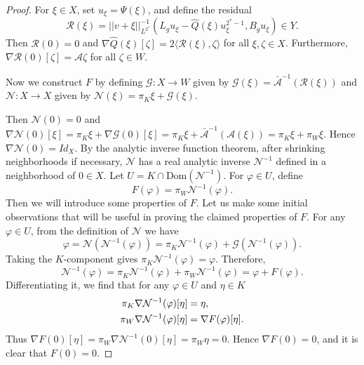 \documentclass[12pt]{amsart}
\newcommand{\vphi}{\varphi}
\newcommand{\na}{{\nabla}}
\begin{document}
\begin{proof}
   For $\xi \in X$, set $u_\xi = \Psi(\xi)$, and define the residual
   \begin{equation}
       \mathcal{R}(\xi)= ||v+\xi||_{L^{2^*}} ^{-1} (L_g u_\xi -\hat{Q}(\xi)u_\xi ^{2^*-1}, B_gu_\xi) \in Y.
   \end{equation}
   Then $\mathcal{R}(0) = 0$ and  $\na \hat{Q}(\xi)[\zeta] = 2 \langle \mathcal{R}(\xi), \zeta\rangle $ for all $\xi,\zeta \in X$. Furthermore, $\na \mathcal{R}(0)[\zeta] = \mathcal{A} \zeta$ for all $\zeta \in W$.

    Now we construct $F$ by defining $\mathcal{G}: X \to W$ given by $\mathcal{G}(\xi)= \bar{\mathcal{A}}^{-1}(\mathcal{R}(\xi))$ and $\mathcal{N} : X \to X$ given by $\mathcal{N}(\xi)= \pi _K \xi + \mathcal{G}(\xi)$.
    
    Then $\mathcal{N}(0)=0$ and $\na \mathcal{N}(0)[\xi]=\pi _K \xi + \na \mathcal{G}(0)[\xi] =\pi _K \xi + \bar{\mathcal{A}}^{-1}(\mathcal{A}(\xi)) = \pi _K \xi +\pi _{W} \xi$. Hence $\na \mathcal{N}(0) = Id_X$. By the analytic inverse function theorem, after shrinking neighborhoods if necessary, $\mathcal{N}$ has a real analytic inverse $\mathcal{N}^{-1}$ defined in a neighborhood of $0 \in X$. Let $U=K \cap \text{Dom}(\mathcal{N}^{-1})$. For $\vphi \in U$, define 
    \begin{equation}
        F(\vphi)= \pi_{W} \mathcal{N}^{-1} (\vphi).
    \end{equation}
    Then we will introduce some properties of $F$.
    Let us make some initial observations that will be useful in proving the claimed properties of $F$. 
    For any $\vphi \in U$, from the definition of $\mathcal{N}$ we have
    \begin{equation} \label{eq6}
        \vphi = \mathcal{N}(\mathcal{N}^{-1}(\vphi)) = \pi_K \mathcal{N}^{-1}(\vphi) + \mathcal{G}(\mathcal{N}^{-1}(\vphi)).
    \end{equation}
    Taking the $K$-component gives $\pi_K \mathcal{N}^{-1}(\vphi)= \vphi$. Therefore, 
    \begin{equation}
        \mathcal{N}^{-1}(\vphi) =\pi_K \mathcal{N}^{-1}(\vphi) + \pi_{W} \mathcal{N}^{-1} (\vphi) =\vphi +F(\vphi).
    \end{equation}
    Differentiating it, we find that for any $\vphi \in U$ and $\eta \in K$
    \begin{align}
    \pi_K \na \mathcal{N}^{-1}(\vphi)[\eta ] &= \eta, \notag\\
    \pi_{W} \na \mathcal{N}^{-1}(\vphi)[\eta ] &=\na F(\vphi)[\eta]. \label{eq4}
    \end{align}
    Thus $\na F(0)[\eta] = \pi_{W} \na \mathcal{N}^{-1}(0)[\eta ] =\pi_{W} \eta = 0$. Hence  $\na F(0)=0$, and it is clear that $F(0)=0$.


\end{proof}
\end{document}

